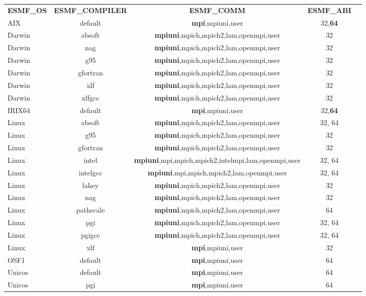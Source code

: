 \begin{tabular}{lcccc}
  {\bfseries ESMF\_OS} &{\bfseries ESMF\_COMPILER} & {\bfseries ESMF\_COMM} & {\bfseries ESMF\_ABI} \\

AIX     &  default      &  {\bf mpi},mpiuni,user         &  32,{\bf 64}  \\
Darwin  &  absoft       &  {\bf mpiuni},mpich,mpich2,lam,openmpi,user  &  32  \\
Darwin  &  nag          &  {\bf mpiuni},mpich,mpich2,lam,openmpi,user  &  32  \\
Darwin  &  g95          &  {\bf mpiuni},mpich,mpich2,lam,openmpi,user  &  32  \\
Darwin  &  gfortran     &  {\bf mpiuni},mpich,mpich2,lam,openmpi,user  &  32  \\
Darwin  &  xlf          &  {\bf mpiuni},mpich,mpich2,lam,openmpi,user  &  32  \\
Darwin  &  xlfgcc       &  {\bf mpiuni},mpich,mpich2,lam,openmpi,user  &  32  \\
IRIX64  &  default      &  {\bf mpi},mpiuni,user         &  32,{\bf 64}  \\
Linux   &  absoft       &  {\bf mpiuni},mpich,mpich2,lam,openmpi,user  &  32, 64 \\
Linux   &  g95          &  {\bf mpiuni},mpich,mpich2,lam,openmpi,user  &  32  \\
Linux   &  gfortran     &  {\bf mpiuni},mpich,mpich2,lam,openmpi,user  &  32  \\
Linux   &  intel        &  {\bf mpiuni},mpi,mpich,mpich2,intelmpi,lam,openmpi,user  &  32, 64 \\
Linux   &  intelgcc     &  {\bf mpiuni},mpi,mpich,mpich2,lam,openmpi,user  &  32, 64 \\
Linux   &  lahey        &  {\bf mpiuni},mpich,mpich2,lam,openmpi,user  &  32  \\
Linux   &  nag          &  {\bf mpiuni},mpich,mpich2,lam,openmpi,user  &  32  \\
Linux   &  pathscale    &  {\bf mpiuni},mpich,mpich2,lam,openmpi,user  &  64  \\
Linux   &  pgi          &  {\bf mpiuni},mpich,mpich2,lam,openmpi,user  &  32, 64  \\
Linux   &  pgigcc       &  {\bf mpiuni},mpich,mpich2,lam,openmpi,user  &  32, 64  \\
Linux   &  xlf          &  {\bf mpi},mpiuni,user         &  32  \\
OSF1    &  default      &  {\bf mpi},mpiuni,user         &  64  \\
Unicos  &  default      &  {\bf mpi},mpiuni,user         &  64  \\
Unicos  &  pgi          &  {\bf mpi},mpiuni,user         &  64

\end{tabular}

\vspace{1ex}

